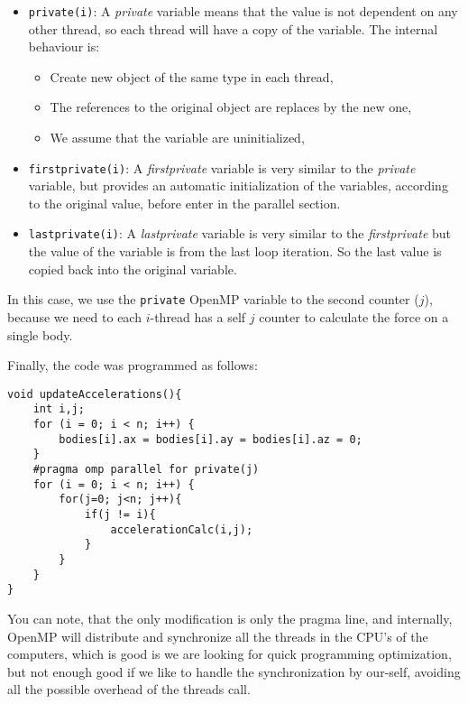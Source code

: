 \begin{itemize}
    \item \texttt{private(i)}:
            A \emph{private} variable means that the value is not dependent on any other thread,
            so each thread will have a copy of the variable.
            The internal behaviour is:
            \begin{itemize}
                \item Create new object of the same type in each thread,
                \item The references to the original object are replaces by the new one,
                \item We assume that the variable are uninitialized,
            \end{itemize}    
    
    \item \texttt{firstprivate(i)}:
            A \emph{firstprivate} variable is very similar to the \emph{private} variable,
            but provides an automatic initialization of the variables, according to the
            original value, before enter in the parallel section.

    \item \texttt{lastprivate(i)}:
            A \emph{lastprivate} variable is very similar to the \emph{firstprivate} but
            the value of the variable is from the last loop iteration.
            So the last value is copied back into the original variable.
\end{itemize}

In this case, we use the \texttt{private} OpenMP variable to the second
counter ($j$), because we need to each $i$-thread has a self $j$ counter
to calculate the force on a single body.

Finally, the code was programmed as follows:

\begin{lstlisting}[style=C]
void updateAccelerations(){
    int i,j;
    for (i = 0; i < n; i++) {
        bodies[i].ax = bodies[i].ay = bodies[i].az = 0;
    }
    #pragma omp parallel for private(j)
    for (i = 0; i < n; i++) {
        for(j=0; j<n; j++){
            if(j != i){
                accelerationCalc(i,j);
            }
        }
    }
}
\end{lstlisting}

You can note, that the only modification is only the
pragma line, and internally, OpenMP will distribute and
synchronize all the threads in the CPU's of the computers,
which is good is we are looking for quick programming
optimization, but not enough good if we like to
handle the synchronization by our-self, avoiding all the
possible overhead of the threads call.

